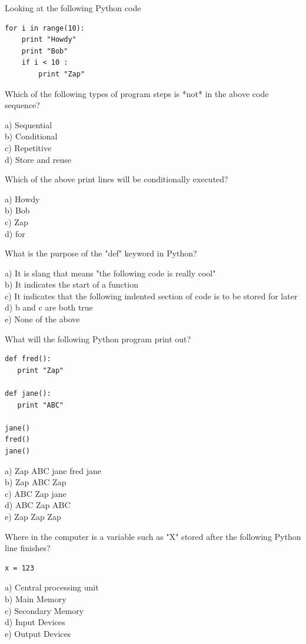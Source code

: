 \documentclass[10pt]{book}
\begin{document}
\begin{ex}
Looking at the following Python code

\beforeverb
\begin{verbatim}
for i in range(10):
    print "Howdy"
    print "Bob"
    if i < 10 : 
        print "Zap"
\end{verbatim}
\afterverb
%
Which of the following types of program steps is *not* in the above code sequence?

a) Sequential\\
b) Conditional\\
c) Repetitive\\
d) Store and reuse
\end{ex}

\begin{ex}
Which of the above print lines will be conditionally executed?

a) Howdy\\
b) Bob\\
c) Zap\\
d) for
\end{ex}

\begin{ex}
What is the purpose of the "def" keyword in Python?

a) It is slang that means "the following code is really cool"\\
b) It indicates the start of a function\\
c) It indicates that the following indented section of code is to be stored for later\\
d) b and c are both true\\
e) None of the above
\end{ex}

\begin{ex}
What will the following Python program print out?

\beforeverb
\begin{verbatim}
def fred():
   print "Zap"

def jane():
   print "ABC"

jane()
fred()
jane()
\end{verbatim}
\afterverb
%
a) Zap ABC jane fred jane\\
b) Zap ABC Zap\\
c) ABC Zap jane\\
d) ABC Zap ABC\\
e) Zap Zap Zap
\end{ex}

\begin{ex}
Where in the computer is a variable such as "X" stored 
after the following Python line finishes?

\beforeverb
\begin{verbatim}
x = 123
\end{verbatim}
\afterverb
%
a) Central processing unit\\
b) Main Memory\\
c) Secondary Memory\\
d) Input Devices\\
e) Output Devices
\end{ex}
\end{document}
